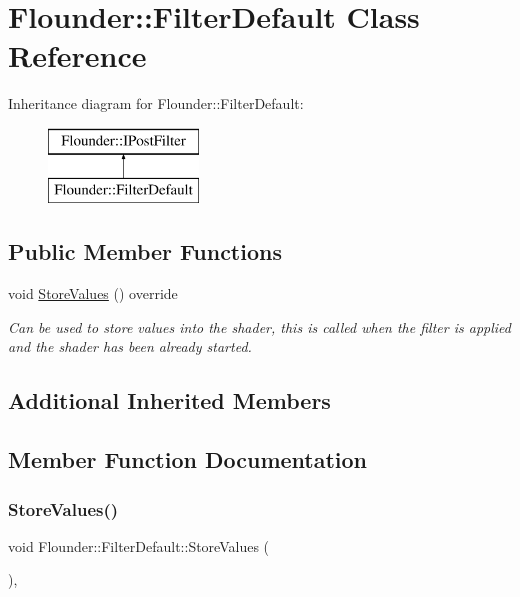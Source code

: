 \hypertarget{class_flounder_1_1_filter_default}{}\section{Flounder\+:\+:Filter\+Default Class Reference}
\label{class_flounder_1_1_filter_default}
Inheritance diagram for Flounder\+:\+:Filter\+Default\+:\begin{figure}[H]
\begin{center}
\leavevmode
\includegraphics[height=2.000000cm]{class_flounder_1_1_filter_default}
\end{center}
\end{figure}
\subsection*{Public Member Functions}
\begin{DoxyCompactItemize}
\item 
void \hyperlink{class_flounder_1_1_filter_default_a60d41f425dcd5ee4666d99254da49062}{Store\+Values} () override
\begin{DoxyCompactList}\small\item\em Can be used to store values into the shader, this is called when the filter is applied and the shader has been already started. \end{DoxyCompactList}\end{DoxyCompactItemize}
\subsection*{Additional Inherited Members}


\subsection{Member Function Documentation}
\mbox{\label{class_flounder_1_1_filter_default_a60d41f425dcd5ee4666d99254da49062}} 
\subsubsection{\texorpdfstring{Store\+Values()}{StoreValues()}}
{\footnotesize\ttfamily void Flounder\+::\+Filter\+Default\+::\+Store\+Values (\begin{DoxyParamCaption}{ }\end{DoxyParamCaption})\hspace{0.3cm}{\ttfamily [override]}, {\ttfamily [virtual]}}



